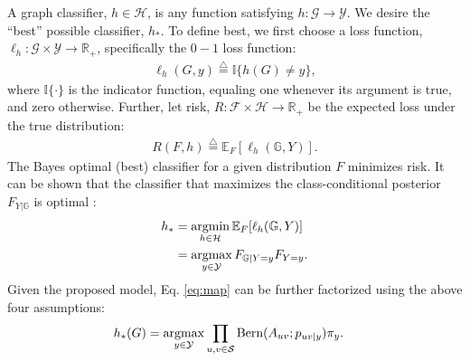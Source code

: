 \documentclass[10pt,journal,cspaper,compsoc]{IEEEtran}
\newcommand{\argmax}{\operatornamewithlimits{argmax}}
\newcommand{\argmin}{\operatornamewithlimits{argmin}}
\newcommand{\GG}{\mathbb{G}}
\newcommand{\EE}{\mathbb{E}}           %
\newcommand{\II}{\mathbb{I}}           %
\providecommand{\mc}[1]{\mathcal{#1}}
\newcommand{\Real}{\mathbb{R}}
\newcommand{\defeq}{\overset{\triangle}{=}}
\newcommand{\comment}[1]{}
\begin{document}
\comment{Formally, we say that} A graph classifier, $h \in \mc{H}$, is any function satisfying $h: \mc{G} \to \mc{Y}$.  We desire the ``best'' possible classifier, $h_*$. To define best, we first choose a loss function, $\ell_h: \mc{G} \times \mc{Y} \to \Real_+$, specifically the $0-1$ loss function:
\begin{align}
\ell_h(G,y) \defeq \II \{h(G) \neq y\}, %
\end{align}
where $\II\{\cdot\}$ is the indicator function, equaling one whenever its argument is true, and zero otherwise.  Further, let risk, $R: \mc{F} \times \mc{H} \to \Real_+$ be the expected loss under the true distribution:
\begin{align}
R(F,h) \defeq \EE_F[\ell_h(\GG,Y)].
\end{align}
The Bayes optimal (best) classifier for a given distribution $F$ minimizes risk.
It can be shown that the classifier that maximizes the class-conditional posterior $F_{Y | \GG}$ is optimal \cite{Bickel2000}:
\begin{align} \label{eq:map}
h_* &= \argmin_{h \in \mc{H}} \EE_F[\ell_h (\GG,Y)] %
\nonumber \\ &= \argmax_{y \in \mc{Y}} F_{\GG|Y=y} F_{Y=y}.
\end{align}
Given the proposed model, Eq. \ref{eq:map} can be further factorized using the above four assumptions:
\begin{align}
h_*(G)
&= \argmax_{y \in \mc{Y}} \prod_{u,v \in \mc{S}} \text{Bern}(A_{uv}; p_{uv|y}) \pi_y.
\end{align}
\end{document}

